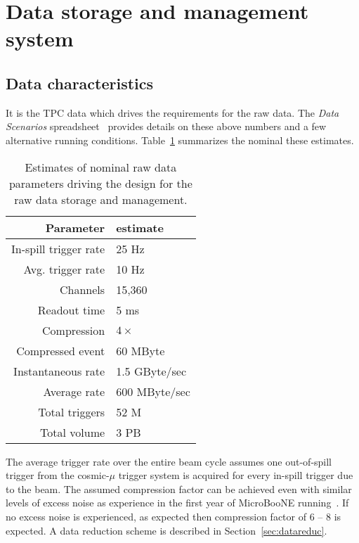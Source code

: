 \section{Data storage and management system}

\subsection{Data characteristics}

It is the TPC data which drives the requirements for the raw \pdsp data.
The \textit{\pdsp Data Scenarios} spreadsheet~\cite{data_spreadsheet}  %
provides details on these above numbers and a few alternative running conditions.
Table~\ref{tab:goldi} summarizes the nominal these estimates.

\begin{table}[h]
  \centering
  \begin{tabular}[h]{|r|l|}
    \hline
    Parameter & estimate  \\
    \hline
    In-spill trigger rate & 25 Hz \\
    Avg. trigger rate & 10 Hz \\
    Channels & 15,360 \\
    Readout time & 5 ms \\
    Compression & $4\times$ \\
    \hline
    Compressed event & 60 MByte  \\
    Instantaneous rate & 1.5 GByte/sec \\
    Average rate & 600 MByte/sec \\
    \hline
    Total triggers & 52 M \\
    Total volume & 3 PB  \\
    \hline
  \end{tabular}
  \caption{Estimates of nominal raw data parameters driving the design for the raw data storage and management.}
  \label{tab:goldi}
\end{table}

The average trigger rate over the entire beam cycle assumes one
out-of-spill trigger from the cosmic-$\mu$ trigger system is acquired
for every in-spill trigger due to the beam.  The assumed compression
factor can be achieved even with similar levels of excess noise as
experience in the first year of MicroBooNE running~\cite{docdb2089}.
If no excess noise is experienced, as expected then compression factor
of 6 -- 8 is expected.  A data reduction scheme is described in
Section~\ref{sec:datareduc}.


